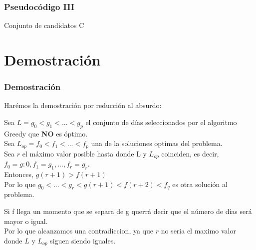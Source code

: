 \documentclass{beamer}
\begin{document}
\begin{frame}
	\frametitle{Pseudocódigo III}
	\begin{algorithmic}
	\Require Conjunto de candidatos C
	

  	   	\EndIf
	\EndWhile
	\end{algorithmic}	
	
\end{frame}

\section{Demostración} 
\begin{frame}
	\frametitle{Demostración}
	Harémos la demostración por reducción al absurdo:
	
	Sea $ L = g_0 < g_1 < ... < g_p $ el conjunto de días seleccionados por el algoritmo Greedy que \textbf{NO} es óptimo.\\
	
	Sea $ L_{op} = f_0 < f_1 < ... < f_p $ una de la soluciones optimas del problema.\\
	
	Sea $r$ el máximo valor posible hasta donde L y $L_{op}$ coinciden, es decir, $f_0=g:0, f_1=g_1,...,f_r = g_r$.\\
	Entonces, $g(r+1) > f(r+1)$ \\
	Por lo que $g_0 < ... < g_r < g(r+1) < f(r+2) < f_q $ es otra solución al problema. 
	
	Si f llega un momento que se separa de g querrá decir que el número de días será mayor o igual.\\
	Por lo que alcanzamos una contradiccion, ya que $r$  no seria el maximo valor donde $L$ y $L_{op}$ siguen siendo iguales.
\end{frame}
\end{document}
